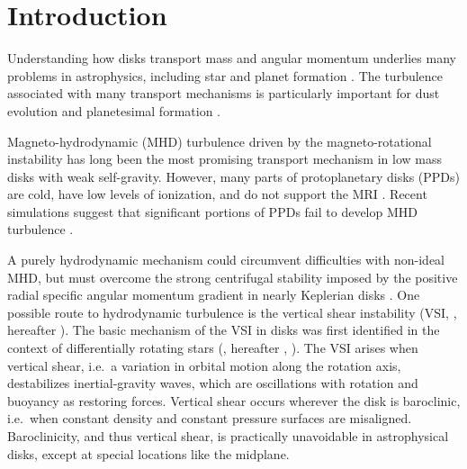 \documentclass[iop, numberedappendix]{emulateapj}
\begin{document}
\section{Introduction}\label{intro}
Understanding how disks transport mass and angular momentum underlies 
many problems in astrophysics, including star and planet formation  
\citep[][]{armitage10}.  The turbulence associated with many transport mechanisms
is particularly important for dust evolution and planetesimal formation \citep{yl07, chiang10}. 

Magneto-hydrodynamic (MHD) turbulence driven by
the magneto-rotational instability \citep[MRI,][]{balbus91} has long been the most
promising transport mechanism in low mass disks with weak self-gravity. 
However, many parts of protoplanetary  
disks (PPDs) are cold, have low levels of ionization, and do not support the MRI 
\citep{blaes94,salmeron03}. Recent simulations
suggest that significant portions of PPDs fail to develop MHD
turbulence \citep[e.g.][]{simon13, lesur14,bai15,gressel15}. 

A purely hydrodynamic mechanism could circumvent difficulties with non-ideal MHD, but must overcome
the strong centrifugal stability imposed by the positive radial specific angular
momentum gradient in nearly Keplerian disks \citep{balbus96}.
One possible route to hydrodynamic turbulence is the vertical shear
instability (VSI, \citealp{urpin98, urpin03, nelson13}, hereafter ).  The
basic mechanism of the VSI  in disks was first 
identified in the context of differentially rotating stars (\citealp{goldreich67}, hereafter , \citealp{fricke68}).   
The VSI arises when vertical shear, i.e.\ a variation in orbital motion along the rotation axis, 
destabilizes inertial-gravity waves, which are oscillations 
with rotation and buoyancy as restoring forces. 
Vertical shear
occurs wherever the disk is baroclinic, i.e.\ when constant 
density and constant pressure surfaces are misaligned.  Baroclinicity, and thus vertical shear, is 
practically unavoidable in astrophysical disks, except at special locations like the
midplane. 
\end{document}
